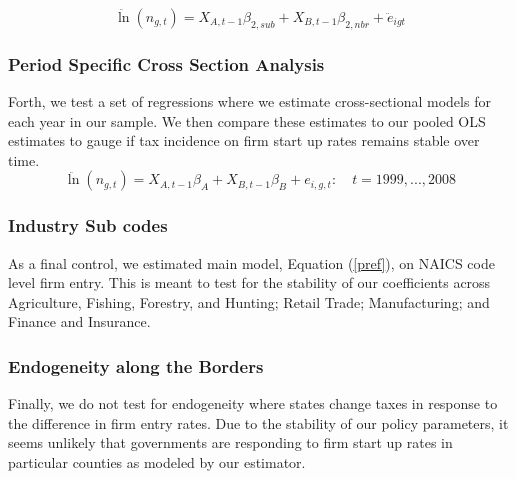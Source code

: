 \begin{equation}\label{sense1}
\ddot \ln(n_{g,t}) = X_{A,t-1}\beta_{2,sub}+X_{B,t-1}\beta_{2,nbr}+ \ddot e_{igt} 
\end{equation}

\subsubsection{Period Specific Cross Section Analysis}
Forth, we test a set of regressions where we estimate cross-sectional models for each year in our sample. We then compare these estimates to our pooled OLS estimates to gauge if tax incidence on firm start up rates remains stable over time. 
\begin{equation}\label{sense2}
\ddot \ln(n_{g,t})  = X_{A,t-1}\beta_{A}+X_{B,t-1}\beta_{B}+ e_{i,g,t}: \quad t = 1999,...,2008
\end{equation}

\subsubsection{Industry Sub codes}

As a final control, we estimated main model, Equation (\ref{pref}), on NAICS code level firm entry. This is meant to test for the stability of our coefficients across Agriculture, Fishing, Forestry, and Hunting; Retail Trade; Manufacturing; and Finance and Insurance.

\subsubsection{Endogeneity along the Borders}

Finally, we do not test for endogeneity where states change taxes in response to the difference in firm entry rates. Due to the stability of our policy parameters, it seems unlikely that governments are responding to firm start up rates in particular counties as modeled by our estimator.
